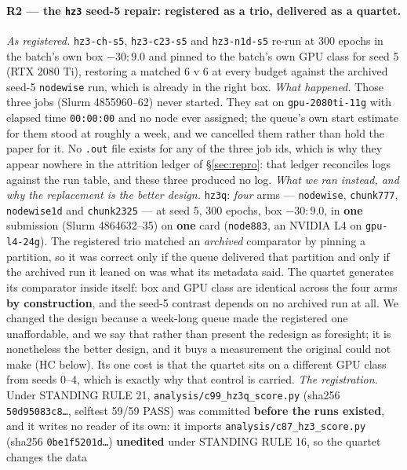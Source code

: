 \documentclass[10pt,letterpaper]{article}
\newcommand{\arm}[1]{\texttt{#1}}
\begin{document}
\paragraph{R2 --- the \arm{hz3} seed-5 repair: registered as a trio, delivered as a quartet.}
\emph{As registered.} \arm{hz3-ch-s5}, \arm{hz3-c23-s5} and \arm{hz3-n1d-s5} re-run at 300 epochs
in the batch's own box $-30{:}9.0$ and pinned to the batch's own GPU class for seed 5
(RTX 2080 Ti), restoring a matched 6 v 6 at every budget against the archived seed-5
\arm{nodewise} run, which is already in the right box.
\emph{What happened.} Those three jobs (Slurm 4855960--62) never started. They sat on
\texttt{gpu-2080ti-11g} with elapsed time \texttt{00:00:00} and no node ever assigned; the queue's
own start estimate for them stood at roughly a week, and we cancelled them rather than hold the
paper for it. No \texttt{.out} file exists for any of the three job ids, which is why they appear
nowhere in the attrition ledger of \S\ref{sec:repro}: that ledger reconciles logs against the run
table, and these three produced no log.
\emph{What we ran instead, and why the replacement is the better design.} \arm{hz3q}:
\emph{four} arms --- \arm{nodewise}, \arm{chunk777}, \arm{nodewise1d} and \arm{chunk2325} --- at
seed 5, 300 epochs, box $-30{:}9.0$, in \textbf{one} submission (Slurm 4864632--35) on
\textbf{one} card (\texttt{node883}, an NVIDIA L4 on \texttt{gpu-l4-24g}). The registered trio
matched an \emph{archived} comparator by pinning a partition, so it was correct only if the queue
delivered that partition and only if the archived run it leaned on was what its metadata said. The
quartet generates its comparator inside itself: box and GPU class are identical across the four
arms \textbf{by construction}, and the seed-5 contrast depends on no archived run at all. We
changed the design because a week-long queue made the registered one unaffordable, and we say that
rather than present the redesign as foresight; it is nonetheless the better design, and it buys a
measurement the original could not make (HC below). Its one cost is that the quartet sits on a
different GPU class from seeds 0--4, which is exactly why that control is carried.
\emph{The registration.} Under STANDING RULE 21, \texttt{analysis/c99\_hz3q\_score.py} (sha256
\texttt{50d95083c8\ldots}, selftest 59/59 PASS) was committed \textbf{before the runs existed}, and
it writes no reader of its own: it imports \texttt{analysis/c87\_hz3\_score.py} (sha256
\texttt{0be1f5201d\ldots}) \textbf{unedited} under STANDING RULE 16, so the quartet changes the data
\end{document}
